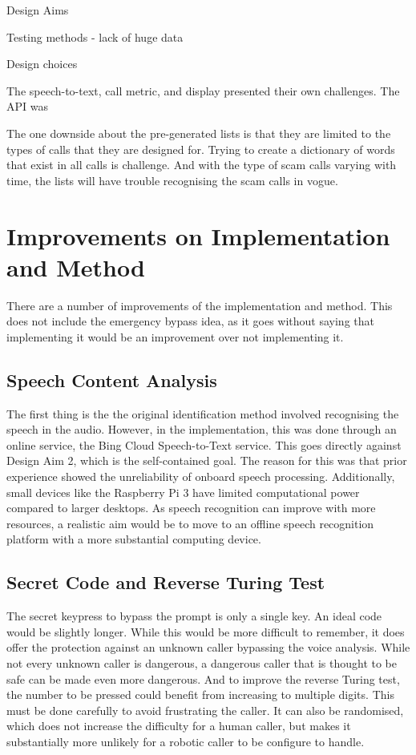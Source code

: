 \documentclass[main.tex]{subfiles}
\begin{document}
Design Aims

Testing methods - lack of huge data

Design choices

The speech-to-text, call metric, and display presented their own challenges. The API was

The one downside about the pre-generated lists is that they are limited to the types of calls that they are designed for. Trying to create a dictionary of words that exist in all calls is challenge. And with the type of scam calls varying with time, the lists will have trouble recognising the scam calls in vogue.

\section{Improvements on Implementation and Method}
There are a number of improvements of the implementation and method. This does not include the emergency bypass idea, as it goes without saying that implementing it would be an improvement over not implementing it.

\subsection{Speech Content Analysis}
The first thing is the the original identification method involved recognising the speech in the audio. However, in the implementation, this was done through an online service, the Bing Cloud Speech-to-Text service. This goes directly against Design Aim 2, which is the self-contained goal. The reason for this was that prior experience showed the unreliability of onboard speech processing. Additionally, small devices like the Raspberry Pi 3 have limited computational power compared to larger desktops. As speech recognition can improve with more resources, a realistic aim would be to move to an offline speech recognition platform with a more substantial computing device.

\subsection{Secret Code and Reverse Turing Test}
The secret keypress to bypass the prompt is only a single key. An ideal code would be slightly longer. While this would be more difficult to remember, it does offer the protection against an unknown caller bypassing the voice analysis. While not every unknown caller is dangerous, a dangerous caller that is thought to be safe can be made even more dangerous. And to improve the reverse Turing test, the number to be pressed could benefit from increasing to multiple digits. This must be done carefully to avoid frustrating the caller. It can also be randomised, which does not increase the difficulty for a human caller, but makes it substantially more unlikely for a robotic caller to be configure to handle.
\end{document}
